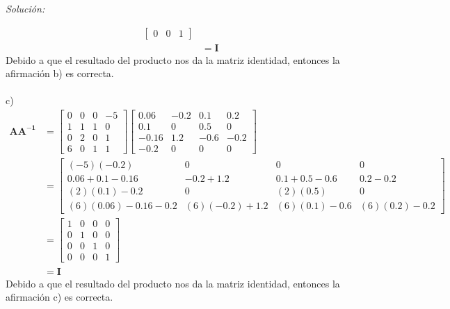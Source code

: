 \documentclass[12pt]{article}
\newenvironment{sol}
    {\emph{Solución:}
    }
    {
    }
\begin{document}
\begin{sol}
\begin{align*}
\begin{bmatrix}
0 & 0 & 1
\end{bmatrix}\\
&= \mathbf{I}
\end{align*}
Debido a que el resultado del producto nos da la matriz identidad, entonces la afirmación b) es correcta. \\ \\ 
c)
\begin{align*}
\mathbf{AA^{-1}} &= 
\begin{bmatrix}
0&0&0&-5\\
1&1&1&0\\
0&2&0&1\\
6&0&1&1
\end{bmatrix}
\begin{bmatrix}
0.06 & -0.2 & 0.1 & 0.2\\
0.1 & 0 & 0.5&0\\
-0.16 & 1.2 & -0.6 & -0.2 \\
-0.2 & 0 & 0 & 0
\end{bmatrix} \\
&= 
\begin{bmatrix}
(-5)(-0.2) & 0 & 0 & 0 \\
0.06 + 0.1 -0.16 & -0.2 +  1.2  & 0.1 + 0.5 -0.6 & 0.2 -0.2  \\
(2)(0.1) -0.2 & 0 &  (2)(0.5) & 0 \\
(6)(0.06) -0.16 -0.2 & (6)(-0.2) +  1.2  & (6)(0.1) -0.6 & (6)(0.2) -0.2 
\end{bmatrix} \\
&=
\begin{bmatrix}
1 & 0 & 0 & 0 \\
0 & 1 & 0 & 0 \\
0 & 0 & 1 & 0 \\
0 & 0 & 0 & 1
\end{bmatrix}\\
&= \mathbf{I}
\end{align*}
Debido a que el resultado del producto nos da la matriz identidad, entonces la afirmación c) es correcta. \\ \\ 
\end{sol}

\pagebreak
\end{document}
